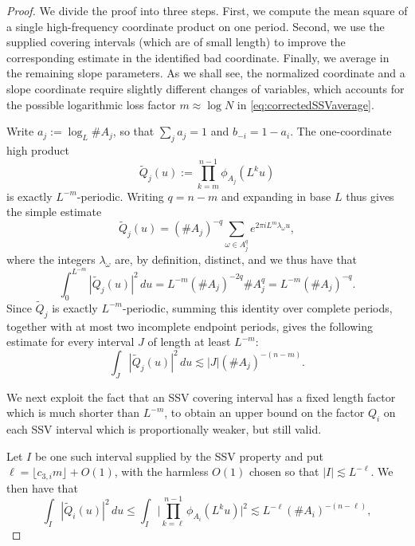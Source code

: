 \documentclass[12pt]{amsart}
\numberwithin{equation}{section}
\begin{document}
\begin{proof}
We divide the proof into three steps.  First, we compute the mean square of a single high-frequency coordinate product on one period.  Second, we use the supplied covering intervals (which are of small length) to improve the corresponding estimate in the identified bad coordinate.  Finally, we average in the remaining slope parameters.  As we shall see, the normalized coordinate and a slope coordinate require slightly different changes of variables, which accounts for the possible logarithmic loss factor $m \approx \log N$ in \eqref{eq:correctedSSVaverage}.

Write $a_j:=\log_L\#A_j$, so that $\sum_ja_j=1$ and
$b_{-i}=1-a_i$.  The one-coordinate high product
\[
 \widetilde Q_j(u):=\prod_{k=m}^{n-1}\phi_{A_j}(L^ku)
\]
is exactly $L^{-m}$-periodic.  Writing $q=n-m$ and expanding in base $L$ thus gives the simple estimate
\[
 \widetilde Q_j(u)
 = (\#A_j)^{-q}
 \sum_{\omega\in A_j^q}e^{2\pi iL^m\lambda_\omega u},
\]
where the integers $\lambda_\omega$ are, by definition, distinct, and we thus have that
\[
 \int_0^{L^{-m}}|\widetilde Q_j(u)|^2\,du
 =L^{-m}(\#A_j)^{-2q}\#A_j^q
 =L^{-m}(\#A_j)^{-q}.
\]
Since $\widetilde Q_j$ is exactly $L^{-m}$-periodic, summing this identity over complete periods, together with at most two incomplete endpoint periods, gives the following estimate for every interval $J$ of length at least $L^{-m}$:
\begin{equation}\label{eq:periodiccoordinateaverage}
 \int_J|\widetilde Q_j(u)|^2\,du
 \lesssim |J|(\#A_j)^{-(n-m)}.
\end{equation}

We next exploit the fact that an SSV covering interval has a fixed length factor which is much shorter than $L^{-m}$, to obtain an upper bound on the factor $Q_{i}$ on each SSV interval which is proportionally weaker, but still valid.

Let $I$ be one such interval supplied by the SSV property and put
$\ell=\lfloor c_{3,i}m\rfloor+O(1)$, with the harmless $O(1)$ chosen so that
$|I|\lesssim L^{-\ell}$.  We then have that
\begin{equation}\label{eq:badcoordinatesplit}
 \int_I|\widetilde Q_i(u)|^2\,du
   \leq \int_{I} \big\lvert \prod_{k = \ell}^{n-1} \phi_{A_i} (L^k u) \big\rvert^2 \lesssim L^{-\ell}(\#A_i)^{-(n-\ell)},
\end{equation}



\end{proof}
\end{document}
